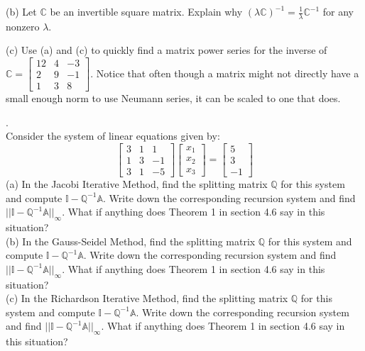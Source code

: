 \documentclass[12 pt]{article}
\begin{document}
\noindent
(b) Let $\mathbb{C}$ be an invertible square matrix. Explain why $(\lambda \mathbb{C})^{-1} = \frac{1}{\lambda} \mathbb{C}^{-1}$ for any nonzero 
$\lambda$. 

\noindent
(c) Use (a) and (c) to quickly find a matrix power series for the inverse of $\mathbb{C}=\begin{bmatrix} 12 & 4 & -3 \\ 2 & 9 & -1 \\ 1 & 3 & 8 \end{bmatrix}$. Notice that often 
though a matrix might not directly have a small enough norm to use Neumann series, it can be scaled to one that does.

\medskip

. \\
Consider the system of linear equations given by:
$$
\begin{bmatrix} 3 & 1 & 1 \\ 1 & 3 & -1 \\ 3 & 1 & -5 \end{bmatrix}
\begin{bmatrix} x_1 \\ x_2 \\ x_3 \end{bmatrix}
=
\begin{bmatrix} 5 \\ 3 \\ -1 \end{bmatrix}
$$
(a) In the Jacobi Iterative Method, find the splitting matrix $\mathbb{Q}$ for this system and compute 
$\mathbb{I} - \mathbb{Q}^{-1} \mathbb{A}$. Write down the corresponding recursion system and 
find $|| \mathbb{I}-\mathbb{Q}^{-1}\mathbb{A}||_{\infty}$. What if anything does Theorem 1 in section 4.6 say in this situation? \\

\noindent
(b) In the Gauss-Seidel Method, find the splitting matrix $\mathbb{Q}$ for this system and compute 
$\mathbb{I} - \mathbb{Q}^{-1} \mathbb{A}$. Write down the corresponding recursion system and 
find $|| \mathbb{I}-\mathbb{Q}^{-1}\mathbb{A}||_{\infty}$. What if anything does Theorem 1 in section 4.6 say in this situation?\\

\noindent
(c) In the Richardson Iterative Method, find the splitting matrix $\mathbb{Q}$ for this system and compute 
$\mathbb{I} - \mathbb{Q}^{-1} \mathbb{A}$. Write down the corresponding recursion system and 
find $|| \mathbb{I}-\mathbb{Q}^{-1}\mathbb{A}||_{\infty}$. What if anything does Theorem 1 in section 4.6 say in this situation?
\end{document}

